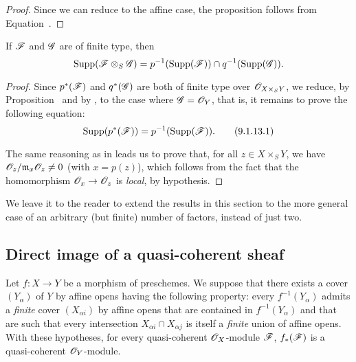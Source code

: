\begin{proof}
\label{proof-1.9.1.12}
Since we can reduce to the affine case, the proposition follows from
Equation~.
\end{proof}

\begin{cor}[9.1.13]
\label{1.9.1.13}
If $\mathscr{F}$ and $\mathscr{G}$ are of finite type, then
\[
  {\mathop{\mathrm{Supp}}\nolimits}(\mathscr{F}\otimes_S\mathscr{G})=p^{-1}({\mathop{\mathrm{Supp}}\nolimits}(\mathscr{F}))\cap q^{-1}({\mathop{\mathrm{Supp}}\nolimits}(\mathscr{G})).
\]
\end{cor}

\begin{proof}
\label{proof-1.9.1.13}
Since $p^*(\mathscr{F})$ and $q^*(\mathscr{G})$ are both of finite type over
$\mathscr{O}_{X\times_S Y}$, we reduce, by Proposition~ and
by , to the case where $\mathscr{G}=\mathscr{O}_Y$, that
is, it remains to prove the following equation:
\begin{equation*}
\label{1.9.1.13.1}
  {\mathop{\mathrm{Supp}}\nolimits}(p^*(\mathscr{F}))=p^{-1}({\mathop{\mathrm{Supp}}\nolimits}(\mathscr{F})).
  \tag{9.1.13.1}
\end{equation*}

The same reasoning as in  leads us to prove that, for all
$z\in X\times_S Y$, we have $\mathscr{O}_z/\mathfrak{m}_x\mathscr{O}_z\neq0$ (with $x=p(z)$),
which follows from the fact that the homomorphism $\OO_x\to\OO_z$ is \emph{local},
by hypothesis.
\end{proof}

We leave it to the reader to extend the results in this section to the more
general case of an arbitrary (but finite) number of factors, instead of just two.

\subsection{Direct image of a quasi-coherent sheaf}
\label{subsection:direct-image-of-qcoh}

\begin{prop}[9.2.1]
\label{1.9.2.1}
Let $f:X\to Y$ be a morphism of
preschemes. We suppose that there exists a cover $(Y_\alpha)$ of $Y$ by affine
opens having the following property: every $f^{-1}(Y_\alpha)$ admits a
\emph{finite} cover $(X_{\alpha i})$ by affine opens that are contained in
$f^{-1}(Y_\alpha)$ and that are such that every intersection $X_{\alpha i}\cap X_{\alpha j}$
is itself a \emph{finite} union of affine opens. With these hypotheses, for
every quasi-coherent $\mathscr{O}_X$-module $\mathscr{F}$, $f_*(\mathscr{F})$ is a
quasi-coherent $\mathscr{O}_Y$-module.
\end{prop}

